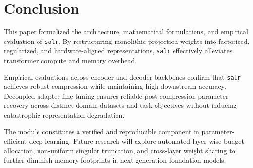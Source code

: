 \section{Conclusion}
This paper formalized the architecture, mathematical formulations, and empirical evaluation of \texttt{salr}. By restructuring monolithic projection weights into factorized, regularized, and hardware-aligned representations, \texttt{salr} effectively alleviates transformer compute and memory overhead.

Empirical evaluations across encoder and decoder backbones confirm that \texttt{salr} achieves robust compression while maintaining high downstream accuracy. Decoupled adapter fine-tuning ensures reliable post-compression parameter recovery across distinct domain datasets and task objectives without inducing catastrophic representation degradation.

The module constitutes a verified and reproducible component in parameter-efficient deep learning. Future research will explore automated layer-wise budget allocation, non-uniform singular truncation, and cross-layer weight sharing to further diminish memory footprints in next-generation foundation models.
